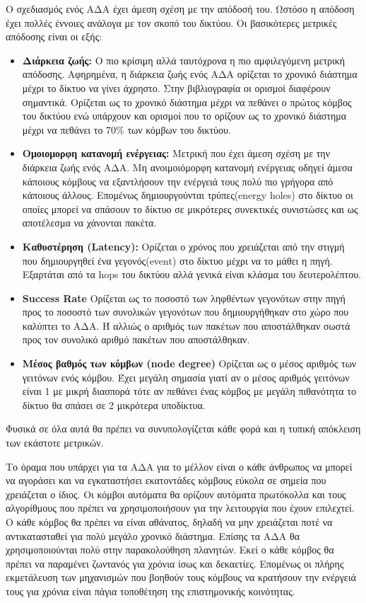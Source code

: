Ο σχεδιασμός ενός ΑΔΑ έχει άμεση σχέση με την απόδοσή του. Ωστόσο η απόδοση έχει πολλές έννοιες ανάλογα με τον σκοπό του δικτύου. Οι βασικότερες μετρικές απόδοσης
είναι οι εξής:
\begin{itemize}
\item \textbf{Διάρκεια ζωής:} Ο πιο κρίσιμη αλλά ταυτόχρονα η πιο αμφιλεγόμενη μετρική απόδοσης. Αφηρημένα, η διάρκεια ζωής ενός ΑΔΑ ορίζεται το χρονικό διάστημα
μέχρι το δίκτυο να γίνει άχρηστο.
Στην βιβλιογραφία οι ορισμοί διαφέρουν σημαντικά.
Ορίζεται ως το χρονικό διάστημα μέχρι να πεθάνει ο πρώτος κόμβος του δικτύου ενώ υπάρχουν και ορισμοί που το ορίζουν ως το χρονικό διάστημα μέχρι να πεθάνει το 70\%
των κόμβων του δικτύου.
\item \textbf{Ομοιομορφη κατανομή ενέργειας:} Μετρική που έχει άμεση σχέση με την διάρκεια ζωής ενός ΑΔΑ.
Μη ανοιμοιόμορφη κατανομή ενέργειας οδηγεί άμεσα κάποιους κόμβους να εξαντλήσουν την ενέργειά τους πολύ πιο γρήγορα από κάποιους άλλους.
Επομένως δημιουργούνται τρύπες(energy holes) στο δίκτυο οι οποίες μπορεί να σπάσουν το δίκτυο σε μικρότερες συνεκτικές συνιστώσες και ως αποτέλεσμα να χάνονται
πακέτα.
\item \textbf{Καθυστέρηση (Latency):} Ορίζεται ο χρόνος που χρειάζεται από την στιγμή που δημιουργηθεί ένα γεγονός(event) στο δίκτυο μέχρι να το μάθει η πηγή.
Εξαρτάται από τα hops του δικτύου αλλά γενικά είναι κλάσμα του δευτερολέπτου.
\item \textbf{Success Rate} Ορίζεται ως το ποσοστό των ληφθέντων γεγονότων στην πηγή προς το ποσοστό των συνολικών γεγονότων που δημιουργήθηκαν στο χώρο που καλύπτει
το ΑΔΑ.
Ή αλλιώς ο αριθμός των πακέτων που αποστάλθηκαν σωστά προς τον συνολικό αριθμό πακέτων που αποστάλθηκαν.
\item \textbf{Μέσος βαθμός των κόμβων (node degree)} Ορίζεται ως ο μέσος αριθμός των γειτόνων ενός κόμβου.
Έχει μεγάλη σημασία γιατί αν ο μέσος αριθμός γειτόνων είναι 1 με μικρή διασπορά τότε αν πεθάνει ένας κόμβος με μεγάλη πιθανότητα το δίκτυο θα σπάσει σε 2 μικρότερα
υποδίκτυα.
\end{itemize}
Φυσικά σε όλα αυτά θα πρέπει να συνυπολογίζεται κάθε φορά και η τυπική απόκλειση των εκάστοτε μετρικών.

Το όραμα που υπάρχει για τα ΑΔΑ για το μέλλον είναι ο κάθε άνθρωπος να μπορεί να αγοράσει και να εγκαταστήσει εκατοντάδες κόμβους εύκολα σε σημεία που χρειάζεται ο
ίδιος.
Οι κόμβοι αυτόματα θα ορίζουν αυτόματα πρωτόκολλα και τους αλγορίθμους που πρέπει να χρησιμοποιήσουν για την λειτουργία που έχουν επιλεχτεί.
Ο κάθε κόμβος θα πρέπει να είναι αθάνατος, δηλαδή να μην χρειάζεται ποτέ να αντικατασταθεί για πολύ μεγάλο χρονικό διάστημα.
Επίσης τα ΑΔΑ θα χρησιμοποιούνται πολύ στην παρακολούθηση πλανητών.
Εκεί ο κάθε κόμβος θα πρέπει να παραμένει ζωντανός για χρόνια ίσως και δεκαετίες.
Επομένως οι πλήρης εκμετάλευση των μηχανισμών που βοηθούν τους κόμβους να κρατήσουν την ενέργειά τους για χρόνια είναι πάγια τοποθέτηση της επιστημονικής κοινότητας.
